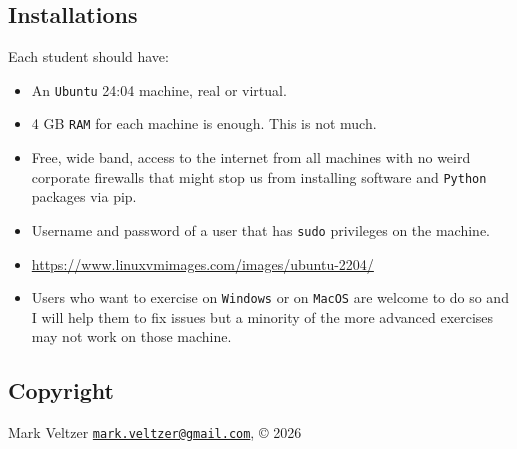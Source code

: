 \documentclass[
]{article}
\providecommand{\tightlist}{%
  \setlength{\itemsep}{0pt}\setlength{\parskip}{0pt}}
\begin{document}
\subsection{Installations}\label{installations}

Each student should have:

\begin{itemize}
\tightlist
\item
  An \texttt{Ubuntu} 24:04 machine, real or virtual.
\item
  4 GB \texttt{RAM} for each machine is enough. This is not much.
\item
  Free, wide band, access to the internet from all machines with no
  weird corporate firewalls that might stop us from installing software
  and \texttt{Python} packages via pip.
\item
  Username and password of a user that has \texttt{sudo} privileges on
  the machine.
\item
  \url{https://www.linuxvmimages.com/images/ubuntu-2204/}
\item
  Users who want to exercise on \texttt{Windows} or on \texttt{MacOS}
  are welcome to do so and I will help them to fix issues but a minority
  of the more advanced exercises may not work on those machine.
\end{itemize}

\subsection{Copyright}\label{copyright}

Mark Veltzer
\href{mailto:mark.veltzer@gmail.com}{\nolinkurl{mark.veltzer@gmail.com}},
© 2026
\end{document}
